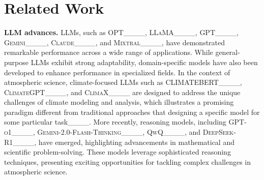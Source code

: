 \section{Related Work}
\textbf{LLM advances.}
LLMs, such as \textsc{OPT}____, \textsc{LLaMA}____, \textsc{GPT}____, \textsc{Gemini}____, \textsc{Claude}____, and \textsc{Mixtral}____, have demonstrated remarkable performance across a wide range of applications. While general-purpose LLMs exhibit strong adaptability, domain-specific models have also been developed to enhance performance in specialized fields.
In the context of atmospheric science, climate-focused LLMs such as \textsc{CLIMATEBERT}____, \textsc{ClimateGPT}____, and \textsc{ClimaX____} are designed to address the unique challenges of climate modeling and analysis, which illustrates a promising paradigm different from traditional approaches that designing a specific model for some particular task____.
More recently, reasoning models, including \textsc{GPT-o1}____, \textsc{Gemini-2.0-Flash-Thinking}____, \textsc{QwQ}____, and \textsc{DeepSeek-R1}____, have emerged, highlighting advancements in mathematical and scientific problem-solving. These models leverage sophisticated reasoning techniques, presenting exciting opportunities for tackling complex challenges in atmospheric science. %



